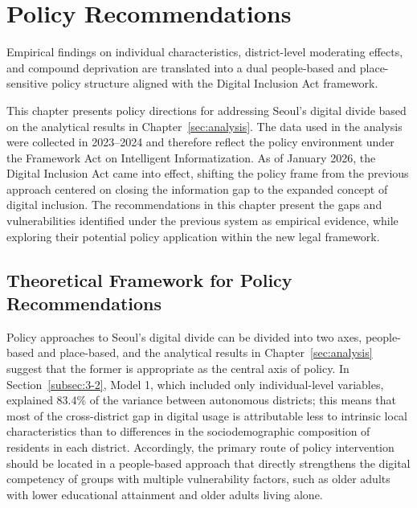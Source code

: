 \section{Policy Recommendations}
\label{sec:policy}


\begin{quoteblock}
Empirical findings on individual characteristics, district-level moderating effects, and compound deprivation are translated into a dual people-based and place-sensitive policy structure aligned with the Digital Inclusion Act framework.
\end{quoteblock}

This chapter presents policy directions for addressing Seoul's digital divide based on the analytical results in Chapter~\ref{sec:analysis}. The data used in the analysis were collected in 2023--2024 and therefore reflect the policy environment under the Framework Act on Intelligent Informatization. As of January 2026, the Digital Inclusion Act came into effect, shifting the policy frame from the previous approach centered on closing the information gap to the expanded concept of digital inclusion. The recommendations in this chapter present the gaps and vulnerabilities identified under the previous system as empirical evidence, while exploring their potential policy application within the new legal framework.

\subsection{Theoretical Framework for Policy Recommendations}
\label{subsec:4-1}

Policy approaches to Seoul's digital divide can be divided into two axes, people-based and place-based, and the analytical results in Chapter~\ref{sec:analysis} suggest that the former is appropriate as the central axis of policy. In Section~\ref{subsec:3-2}, Model 1, which included only individual-level variables, explained 83.4\% of the variance between autonomous districts; this means that most of the cross-district gap in digital usage is attributable less to intrinsic local characteristics than to differences in the sociodemographic composition of residents in each district. Accordingly, the primary route of policy intervention should be located in a people-based approach that directly strengthens the digital competency of groups with multiple vulnerability factors, such as older adults with lower educational attainment and older adults living alone.

